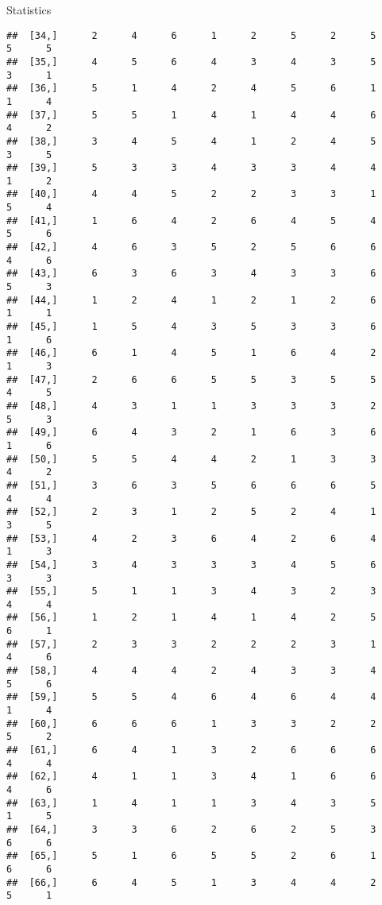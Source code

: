 \documentclass[
  ignorenonframetext,
]{beamer}
\begin{document}
\begin{frame}[fragile]{Statistics}
\begin{verbatim}
##  [34,]      2      4      6      1      2      5      2      5      5      5
##  [35,]      4      5      6      4      3      4      3      5      3      1
##  [36,]      5      1      4      2      4      5      6      1      1      4
##  [37,]      5      5      1      4      1      4      4      6      4      2
##  [38,]      3      4      5      4      1      2      4      5      3      5
##  [39,]      5      3      3      4      3      3      4      4      1      2
##  [40,]      4      4      5      2      2      3      3      1      5      4
##  [41,]      1      6      4      2      6      4      5      4      5      6
##  [42,]      4      6      3      5      2      5      6      6      4      6
##  [43,]      6      3      6      3      4      3      3      6      5      3
##  [44,]      1      2      4      1      2      1      2      6      1      1
##  [45,]      1      5      4      3      5      3      3      6      1      6
##  [46,]      6      1      4      5      1      6      4      2      1      3
##  [47,]      2      6      6      5      5      3      5      5      4      5
##  [48,]      4      3      1      1      3      3      3      2      5      3
##  [49,]      6      4      3      2      1      6      3      6      1      6
##  [50,]      5      5      4      4      2      1      3      3      4      2
##  [51,]      3      6      3      5      6      6      6      5      4      4
##  [52,]      2      3      1      2      5      2      4      1      3      5
##  [53,]      4      2      3      6      4      2      6      4      1      3
##  [54,]      3      4      3      3      3      4      5      6      3      3
##  [55,]      5      1      1      3      4      3      2      3      4      4
##  [56,]      1      2      1      4      1      4      2      5      6      1
##  [57,]      2      3      3      2      2      2      3      1      4      6
##  [58,]      4      4      4      2      4      3      3      4      5      6
##  [59,]      5      5      4      6      4      6      4      4      1      4
##  [60,]      6      6      6      1      3      3      2      2      5      2
##  [61,]      6      4      1      3      2      6      6      6      4      4
##  [62,]      4      1      1      3      4      1      6      6      4      6
##  [63,]      1      4      1      1      3      4      3      5      1      5
##  [64,]      3      3      6      2      6      2      5      3      6      6
##  [65,]      5      1      6      5      5      2      6      1      6      6
##  [66,]      6      4      5      1      3      4      4      2      5      1

\end{verbatim}
\end{frame}
\end{document}
